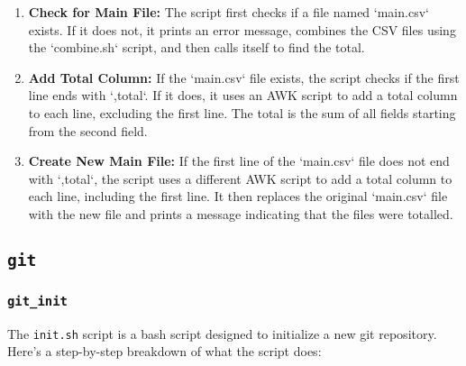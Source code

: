 \documentclass{article}
\begin{document}
\begin{enumerate}
    \item \textbf{Check for Main File:} The script first checks if a file named `main.csv` exists. If it does not, it prints an error message, combines the CSV files using the `combine.sh` script, and then calls itself to find the total.
    
    \item \textbf{Add Total Column:} If the `main.csv` file exists, the script checks if the first line ends with `,total`. If it does, it uses an AWK script to add a total column to each line, excluding the first line. The total is the sum of all fields starting from the second field.
    
    \item \textbf{Create New Main File:} If the first line of the `main.csv` file does not end with `,total`, the script uses a different AWK script to add a total column to each line, including the first line. It then replaces the original `main.csv` file with the new file and prints a message indicating that the files were totalled.
\end{enumerate}

\subsection{\texttt{git}}
\subsubsection{\texttt{git\_init}}
The \texttt{init.sh} script is a bash script designed to initialize a new git repository. Here's a step-by-step breakdown of what the script does:
\end{document}
